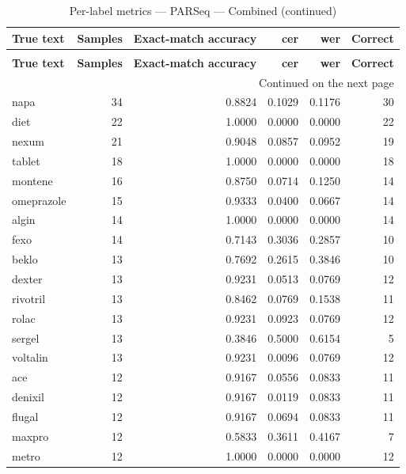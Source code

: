 \begingroup
\setlength{\tabcolsep}{2.5pt}
\renewcommand{\arraystretch}{1.05}
\sloppy
\scriptsize
\begin{longtable}{p{3.0cm}rrrrr}
\caption{Per-label metrics — PARSeq — Combined}\label{tab:e4-03_parseq_evaluation-per-label}\\
\toprule
\textbf{True text} & \textbf{Samples} & \textbf{Exact-match accuracy} & \textbf{cer} & \textbf{wer} & \textbf{Correct} \\
\midrule
\endfirsthead
\caption*{Per-label metrics — PARSeq — Combined (continued)}\\
\toprule
\textbf{True text} & \textbf{Samples} & \textbf{Exact-match accuracy} & \textbf{cer} & \textbf{wer} & \textbf{Correct} \\
\midrule
\endhead
\midrule
\multicolumn{6}{r}{Continued on the next page}\\
\endfoot
\bottomrule
\endlastfoot
napa & 34 & 0.8824 & 0.1029 & 0.1176 & 30 \\
diet & 22 & 1.0000 & 0.0000 & 0.0000 & 22 \\
nexum & 21 & 0.9048 & 0.0857 & 0.0952 & 19 \\
tablet & 18 & 1.0000 & 0.0000 & 0.0000 & 18 \\
montene & 16 & 0.8750 & 0.0714 & 0.1250 & 14 \\
omeprazole & 15 & 0.9333 & 0.0400 & 0.0667 & 14 \\
algin & 14 & 1.0000 & 0.0000 & 0.0000 & 14 \\
fexo & 14 & 0.7143 & 0.3036 & 0.2857 & 10 \\
beklo & 13 & 0.7692 & 0.2615 & 0.3846 & 10 \\
dexter & 13 & 0.9231 & 0.0513 & 0.0769 & 12 \\
rivotril & 13 & 0.8462 & 0.0769 & 0.1538 & 11 \\
rolac & 13 & 0.9231 & 0.0923 & 0.0769 & 12 \\
sergel & 13 & 0.3846 & 0.5000 & 0.6154 & 5 \\
voltalin & 13 & 0.9231 & 0.0096 & 0.0769 & 12 \\
ace & 12 & 0.9167 & 0.0556 & 0.0833 & 11 \\
denixil & 12 & 0.9167 & 0.0119 & 0.0833 & 11 \\
flugal & 12 & 0.9167 & 0.0694 & 0.0833 & 11 \\
maxpro & 12 & 0.5833 & 0.3611 & 0.4167 & 7 \\
metro & 12 & 1.0000 & 0.0000 & 0.0000 & 12 \\

\end{longtable}

